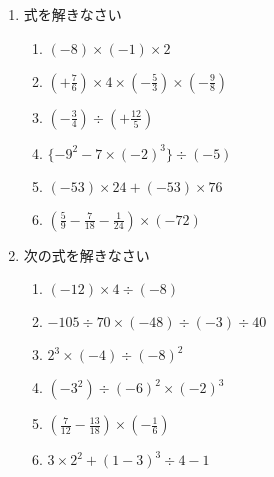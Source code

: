 \documentclass[twocolumn, fleqn]{jsarticle}
\begin{document}



  \begin{enumerate}
    \item 式を解きなさい

      \begin{enumerate}
        \item  $ (-8) \times (-1) \times 2 $
          \vfill
        \item  $(+ \frac{7}{6})\times 4 \times(- \frac{5}{3}) \times (-\frac{9}{8})$
          \vfill
        \item  $ (-\frac{3}{4} )\div (+\frac{12}{5}) $
          \vfill
        \item $\{-9^2 -7 \times (-2)^3\} \div (-5)$
          \vfill
        \item $(-53) \times 24 + (-53) \times 76$
          \vfill
        \item $( \frac{5}{9}- \frac{7}{18} -\frac{1}{24}) \times (-72)$
          \vfill
      \end{enumerate}

    \newpage
  \item 次の式を解きなさい

      \begin{enumerate}
        \item  $(-12) \times 4 \div (-8)$
          \vfill
        \item  $ - 105 \div 70 \times (-48) \div (-3) \div 40$
          \vfill
        \item  $2^3 \times (-4) \div (-8)^2$
          \vfill
        \item $(-3^2) \div(-6)^2 \times (-2)^3$
          \vfill
        \item $(\frac{7}{12}-\frac{13}{18}) \times (- \frac{1}{6})$
          \vfill
      \item $3 \times 2^2 +(1-3)^3 \div 4 -1$
          \vfill
      \end{enumerate}

  \end{enumerate}
\end{document}
